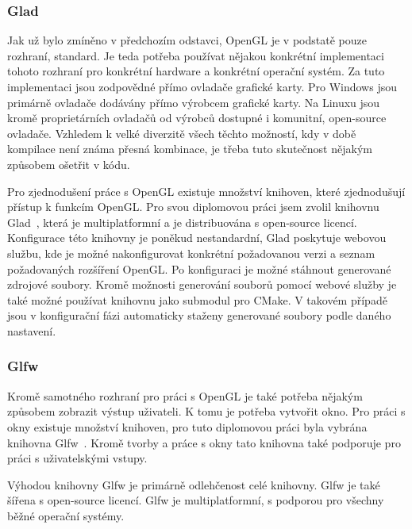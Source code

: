 \documentclass[czech,master]{diploma}
\begin{document}
\subsubsection{Glad}
Jak už bylo zmíněno v předchozím odstavci, OpenGL je v podstatě pouze rozhraní, standard. Je teda potřeba používat nějakou konkrétní implementaci tohoto rozhraní pro konkrétní hardware a konkrétní operační systém. Za tuto implementaci jsou zodpovědné přímo ovladače grafické karty. Pro Windows jsou primárně ovladače dodávány přímo výrobcem grafické karty. Na Linuxu jsou kromě proprietárních ovladačů od výrobců dostupné i komunitní, open-source ovladače. Vzhledem k velké diverzitě všech těchto možností, kdy v době kompilace není známa přesná kombinace, je třeba tuto skutečnost nějakým způsobem ošetřit v kódu.\par
Pro zjednodušení práce s OpenGL existuje množství knihoven, které zjednodušují přístup k funkcím OpenGL\@. Pro svou diplomovou práci jsem zvolil knihovnu Glad~\cite{sourceGlad}, která je multiplatformní a je distribuována s open-source licencí. Konfigurace této knihovny je poněkud nestandardní, Glad poskytuje webovou službu, kde je možné nakonfigurovat konkrétní požadovanou verzi a seznam požadovaných rozšíření OpenGL\@. Po konfiguraci je možné stáhnout generované zdrojové soubory. Kromě možnosti generování souborů pomocí webové služby je také možné používat knihovnu jako submodul pro CMake. V takovém případě jsou v konfigurační fázi automaticky staženy generované soubory podle daného nastavení.

\subsubsection{Glfw}
Kromě samotného rozhraní pro práci s OpenGL je také potřeba nějakým způsobem zobrazit výstup uživateli. K tomu je potřeba vytvořit okno. Pro práci s okny existuje množství knihoven, pro tuto diplomovou práci byla vybrána knihovna Glfw~\cite{sourceGLFW}. Kromě tvorby a práce s okny tato knihovna také podporuje pro práci s uživatelskými vstupy.\par
Výhodou knihovny Glfw je primárně odlehčenost celé knihovny. Glfw je také šířena s open-source licencí. Glfw je multiplatformní, s podporou pro všechny běžné operační systémy.
\end{document}

